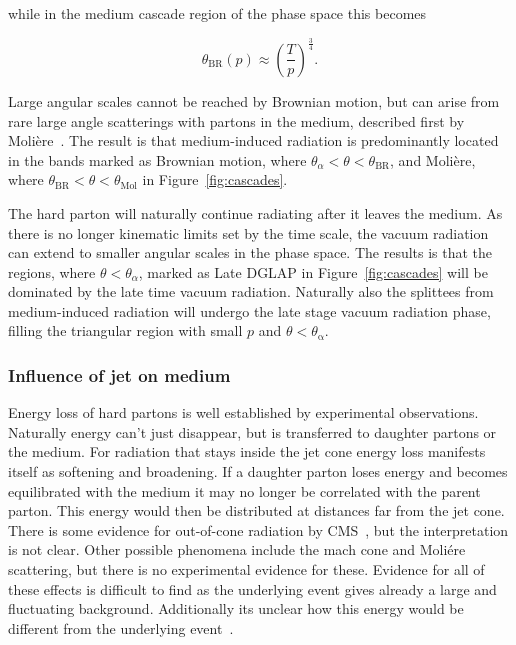 \noindent while in the medium cascade region of the phase space this becomes

\begin{equation}
\theta_\mathrm{BR}\left(p\right) \approx \left(\frac{T}{p}\right)^{\frac{3}{4}}.
\end{equation}

\begin{sloppypar}
\noindent Large angular scales cannot be reached by Brownian motion, but can arise from rare large angle scatterings with partons in the medium, described first by Molière~\cite{Moliere:1947zza}. The result is that medium-induced radiation is predominantly located in the bands marked as Brownian motion, where $\theta_\alpha < \theta < \theta_\mathrm{BR}$, and Moli\`ere, where $\theta_\mathrm{BR} < \theta < \theta_\mathrm{Mol}$ in Figure~\ref{fig:cascades}. 
\end{sloppypar}

The hard parton will naturally continue radiating after it leaves the medium. As there is no longer kinematic limits set by the time scale, the vacuum radiation can extend to smaller angular scales in the phase space. The results is that the regions, where $\theta<\theta_\alpha$, marked as Late DGLAP in Figure~\ref{fig:cascades} will be dominated by the late time vacuum radiation. Naturally also the splittees from medium-induced radiation will undergo the late stage vacuum radiation phase, filling the triangular region with small $p$ and $\theta < \theta_\mathrm{\alpha}$.



\subsubsection*{Influence of jet on medium}
Energy loss of hard partons is well established by experimental observations. Naturally energy can't just disappear, but is transferred to daughter partons or the medium. For radiation that stays inside the jet cone energy loss manifests itself as softening and broadening. If a daughter parton loses energy and becomes equilibrated with the medium it may no longer be correlated with the parent parton. This energy would then be distributed at distances far from the jet cone. There is some evidence for out-of-cone radiation by CMS~\cite{Chatrchyan:2011sx}, but the interpretation is not clear. Other possible phenomena include the mach cone and Moliére scattering, but there is no experimental evidence for these. Evidence for all of these effects is difficult to find as the underlying event gives already a large and fluctuating background. Additionally its unclear how this energy would be different from the underlying event~\cite{Connors:2017ptx}.
